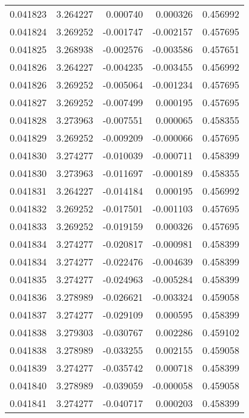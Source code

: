 \begin{tabular}{lrrrr}
0.041823    &  3.264227 &  0.000740 &  0.000326 &             0.456992 \\
0.041824    &  3.269252 & -0.001747 & -0.002157 &             0.457695 \\
0.041825    &  3.268938 & -0.002576 & -0.003586 &             0.457651 \\
0.041826    &  3.264227 & -0.004235 & -0.003455 &             0.456992 \\
0.041826    &  3.269252 & -0.005064 & -0.001234 &             0.457695 \\
0.041827    &  3.269252 & -0.007499 &  0.000195 &             0.457695 \\
0.041828    &  3.273963 & -0.007551 &  0.000065 &             0.458355 \\
0.041829    &  3.269252 & -0.009209 & -0.000066 &             0.457695 \\
0.041830    &  3.274277 & -0.010039 & -0.000711 &             0.458399 \\
0.041830    &  3.273963 & -0.011697 & -0.000189 &             0.458355 \\
0.041831    &  3.264227 & -0.014184 &  0.000195 &             0.456992 \\
0.041832    &  3.269252 & -0.017501 & -0.001103 &             0.457695 \\
0.041833    &  3.269252 & -0.019159 &  0.000326 &             0.457695 \\
0.041834    &  3.274277 & -0.020817 & -0.000981 &             0.458399 \\
0.041834    &  3.274277 & -0.022476 & -0.004639 &             0.458399 \\
0.041835    &  3.274277 & -0.024963 & -0.005284 &             0.458399 \\
0.041836    &  3.278989 & -0.026621 & -0.003324 &             0.459058 \\
0.041837    &  3.274277 & -0.029109 &  0.000595 &             0.458399 \\
0.041838    &  3.279303 & -0.030767 &  0.002286 &             0.459102 \\
0.041838    &  3.278989 & -0.033255 &  0.002155 &             0.459058 \\
0.041839    &  3.274277 & -0.035742 &  0.000718 &             0.458399 \\
0.041840    &  3.278989 & -0.039059 & -0.000058 &             0.459058 \\
0.041841    &  3.274277 & -0.040717 &  0.000203 &             0.458399 \\

\end{tabular}
